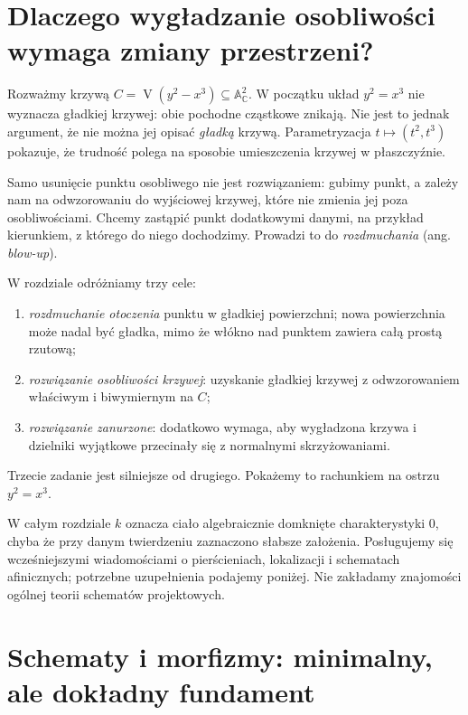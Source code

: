 \documentclass[11pt,a4paper,openany]{report}
\numberwithin{equation}{section}
\theoremstyle{plain}
\theoremstyle{definition}
\theoremstyle{remark}
\newcommand{\C}{\mathbb C}
\newcommand{\A}{\mathbb A}
\newcommand{\V}{\operatorname V}
\begin{document}
\providecommand{\atlasref}[2]{#2}


\section{Dlaczego wygładzanie osobliwości wymaga zmiany przestrzeni?}
\label{sec:ga5-motywacja}

Rozważmy krzywą $C=\V(y^2-x^3)\subseteq\A^2_\C$. W początku układ
$y^2=x^3$ nie wyznacza gładkiej krzywej: obie pochodne cząstkowe
znikają. Nie jest to jednak argument, że nie można jej opisać
\emph{gładką} krzywą. Parametryzacja $t\mapsto(t^2,t^3)$ pokazuje, że
trudność polega na sposobie umieszczenia krzywej w płaszczyźnie.

Samo usunięcie punktu osobliwego nie jest rozwiązaniem: gubimy punkt,
a zależy nam na odwzorowaniu do wyjściowej krzywej, które nie zmienia
jej poza osobliwościami. Chcemy zastąpić punkt dodatkowymi danymi,
na przykład kierunkiem, z którego do niego dochodzimy. Prowadzi to
do \emph{rozdmuchania} (ang. \emph{blow-up}).

W rozdziale odróżniamy trzy cele:
\begin{enumerate}[label=\arabic*)]
\item \emph{rozdmuchanie otoczenia} punktu w gładkiej powierzchni;
      nowa powierzchnia może nadal być gładka, mimo że włókno nad
      punktem zawiera całą prostą rzutową;
\item \emph{rozwiązanie osobliwości krzywej}: uzyskanie gładkiej
      krzywej z odwzorowaniem właściwym i biwymiernym na $C$;
\item \emph{rozwiązanie zanurzone}: dodatkowo wymaga, aby wygładzona
      krzywa i dzielniki wyjątkowe przecinały się z normalnymi
      skrzyżowaniami.
\end{enumerate}
Trzecie zadanie jest silniejsze od drugiego. Pokażemy to rachunkiem
na ostrzu $y^2=x^3$.

W całym rozdziale $k$ oznacza ciało algebraicznie domknięte
charakterystyki $0$, chyba że przy danym twierdzeniu zaznaczono
słabsze założenia. Posługujemy się wcześniejszymi wiadomościami
o pierścieniach, lokalizacji i schematach afinicznych; potrzebne
uzupełnienia podajemy poniżej. Nie zakładamy znajomości ogólnej
teorii schematów projektowych.

\section{Schematy i morfizmy: minimalny, ale dokładny fundament}
\label{sec:ga5-schematy}
\end{document}
